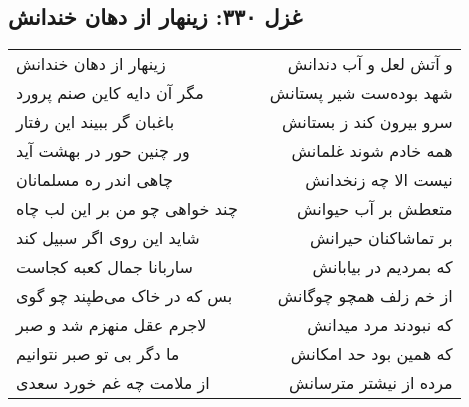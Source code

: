 \begin{center}
\section*{غزل ۳۳۰: زینهار از دهان خندانش}
\label{sec:330}
\begin{longtable}{l p{0.5cm} r}
زینهار از دهان خندانش
&&
و آتش لعل و آب دندانش
\\
مگر آن دایه کاین صنم پرورد
&&
شهد بوده‌ست شیر پستانش
\\
باغبان گر ببیند این رفتار
&&
سرو بیرون کند ز بستانش
\\
ور چنین حور در بهشت آید
&&
همه خادم شوند غلمانش
\\
چاهی اندر ره مسلمانان
&&
نیست الا چه زنخدانش
\\
چند خواهی چو من بر این لب چاه
&&
متعطش بر آب حیوانش
\\
شاید این روی اگر سبیل کند
&&
بر تماشاکنان حیرانش
\\
ساربانا جمال کعبه کجاست
&&
که بمردیم در بیابانش
\\
بس که در خاک می‌طپند چو گوی
&&
از خم زلف همچو چوگانش
\\
لاجرم عقل منهزم شد و صبر
&&
که نبودند مرد میدانش
\\
ما دگر بی تو صبر نتوانیم
&&
که همین بود حد امکانش
\\
از ملامت چه غم خورد سعدی
&&
مرده از نیشتر مترسانش
\\
\end{longtable}
\end{center}
